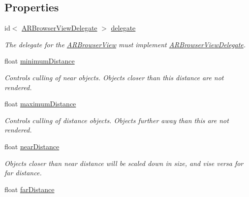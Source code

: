 \subsection*{\-Properties}
\begin{DoxyCompactItemize}
\item 
\hypertarget{interface_a_r_browser_view_ac71040f5d7529f5d1585f774524e6e48}{
id$<$ \hyperlink{protocol_a_r_browser_view_delegate-p}{\-A\-R\-Browser\-View\-Delegate} $>$ \hyperlink{interface_a_r_browser_view_ac71040f5d7529f5d1585f774524e6e48}{delegate}}
\label{interface_a_r_browser_view_ac71040f5d7529f5d1585f774524e6e48}

\begin{DoxyCompactList}\small\item\em \-The delegate for the \hyperlink{interface_a_r_browser_view}{\-A\-R\-Browser\-View} must implement \hyperlink{protocol_a_r_browser_view_delegate-p}{\-A\-R\-Browser\-View\-Delegate}. \end{DoxyCompactList}\item 
\hypertarget{interface_a_r_browser_view_a4831f23b6b057d032491050a2dd826be}{
float \hyperlink{interface_a_r_browser_view_a4831f23b6b057d032491050a2dd826be}{minimum\-Distance}}
\label{interface_a_r_browser_view_a4831f23b6b057d032491050a2dd826be}

\begin{DoxyCompactList}\small\item\em \-Controls culling of near objects. \-Objects closer than this distance are not rendered. \end{DoxyCompactList}\item 
\hypertarget{interface_a_r_browser_view_a3828caf0a7d28ba8e9417088ce4e736c}{
float \hyperlink{interface_a_r_browser_view_a3828caf0a7d28ba8e9417088ce4e736c}{maximum\-Distance}}
\label{interface_a_r_browser_view_a3828caf0a7d28ba8e9417088ce4e736c}

\begin{DoxyCompactList}\small\item\em \-Controls culling of distance objects. \-Objects further away than this are not rendered. \end{DoxyCompactList}\item 
float \hyperlink{interface_a_r_browser_view_a7d1856b25014bdbb42e053808fed67b5}{near\-Distance}
\begin{DoxyCompactList}\small\item\em \-Objects closer than near distance will be scaled down in size, and vise versa for far distance. \end{DoxyCompactList}\item 
\hypertarget{interface_a_r_browser_view_a24e7722ea5439f2b161939a91529643f}{
float \hyperlink{interface_a_r_browser_view_a24e7722ea5439f2b161939a91529643f}{far\-Distance}}
\label{interface_a_r_browser_view_a24e7722ea5439f2b161939a91529643f}


\end{DoxyCompactItemize}
